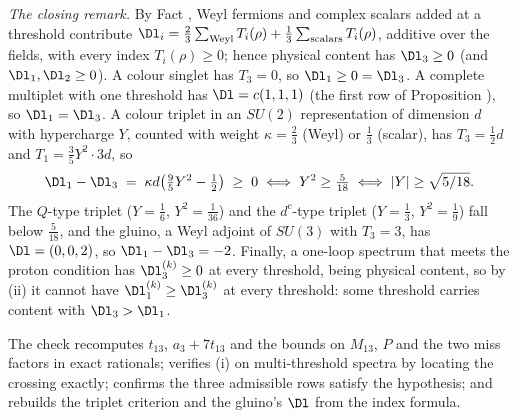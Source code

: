 \emph{The closing remark.} By Fact , Weyl fermions and complex scalars added at a threshold contribute $\Dl_{i} = \tfrac23\sum_{\mathrm{Weyl}}T_{i}(\rho) + \tfrac13\sum_{\mathrm{scalars}}T_{i}(\rho)$, additive over the fields, with every index $T_{i}(\rho) \ge 0$; hence physical content has $\Dl_{3} \ge 0$ (and $\Dl_{1}, \Dl_{2} \ge 0$). A colour singlet has $T_{3} = 0$, so $\Dl_{1} \ge 0 = \Dl_{3}$. A complete multiplet with one threshold has $\Dl = c(1,1,1)$ (the first row of Proposition ), so $\Dl_{1} = \Dl_{3}$. A colour triplet in an $SU(2)$ representation of dimension $d$ with hypercharge $Y$, counted with weight $\kappa = \tfrac23$ (Weyl) or $\tfrac13$ (scalar), has $T_{3} = \tfrac12 d$ and $T_{1} = \tfrac35 Y^{2} \cdot 3d$, so
\[
\Dl_{1} - \Dl_{3} \;=\; \kappa d\bigl(\tfrac95 Y^{2} - \tfrac12\bigr) \;\ge\; 0 \iff Y^{2} \ge \tfrac{5}{18} \iff |Y| \ge \sqrt{5/18}.
\]
The $Q$-type triplet ($Y = \tfrac16$, $Y^{2} = \tfrac{1}{36}$) and the $d^{c}$-type triplet ($Y = \tfrac13$, $Y^{2} = \tfrac19$) fall below $\tfrac{5}{18}$, and the gluino, a Weyl adjoint of $SU(3)$ with $T_{3} = 3$, has $\Dl = (0, 0, 2)$, so $\Dl_{1} - \Dl_{3} = -2$. Finally, a one-loop spectrum that meets the proton condition has $\Dl^{(k)}_{3} \ge 0$ at every threshold, being physical content, so by (ii) it cannot have $\Dl^{(k)}_{1} \ge \Dl^{(k)}_{3}$ at every threshold: some threshold carries content with $\Dl_{3} > \Dl_{1}$.

The check recomputes $t_{13}$, $a_{3} + 7t_{13}$ and the bounds on $M_{13}$, $P$ and the two miss factors in exact rationals; verifies (i) on multi-threshold spectra by locating the crossing exactly; confirms the three admissible rows satisfy the hypothesis; and rebuilds the triplet criterion and the gluino's $\Dl$ from the index formula.
